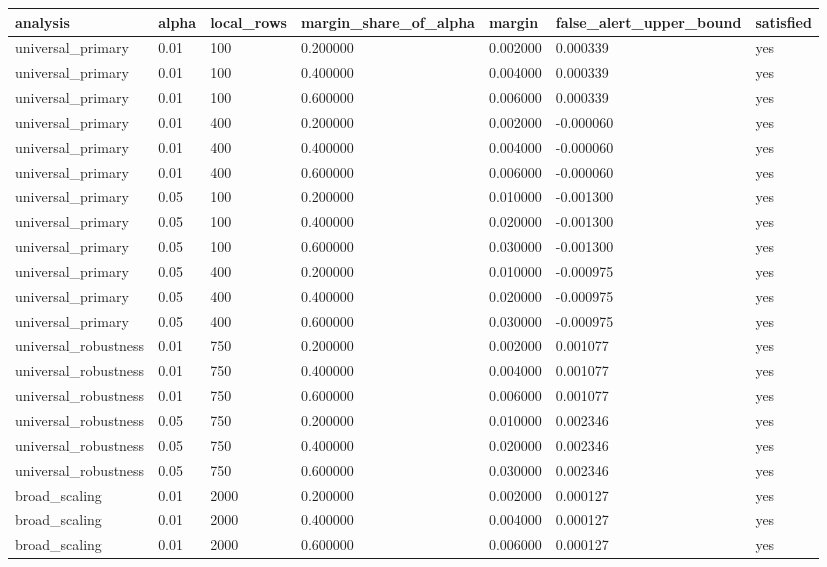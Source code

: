 \begin{tabular}{lllllll}
\toprule
analysis & alpha & local\_rows & margin\_share\_of\_alpha & margin & false\_alert\_upper\_bound & satisfied \\
\midrule
universal\_primary & 0.01 & 100 & 0.200000 & 0.002000 & 0.000339 & yes \\
universal\_primary & 0.01 & 100 & 0.400000 & 0.004000 & 0.000339 & yes \\
universal\_primary & 0.01 & 100 & 0.600000 & 0.006000 & 0.000339 & yes \\
universal\_primary & 0.01 & 400 & 0.200000 & 0.002000 & -0.000060 & yes \\
universal\_primary & 0.01 & 400 & 0.400000 & 0.004000 & -0.000060 & yes \\
universal\_primary & 0.01 & 400 & 0.600000 & 0.006000 & -0.000060 & yes \\
universal\_primary & 0.05 & 100 & 0.200000 & 0.010000 & -0.001300 & yes \\
universal\_primary & 0.05 & 100 & 0.400000 & 0.020000 & -0.001300 & yes \\
universal\_primary & 0.05 & 100 & 0.600000 & 0.030000 & -0.001300 & yes \\
universal\_primary & 0.05 & 400 & 0.200000 & 0.010000 & -0.000975 & yes \\
universal\_primary & 0.05 & 400 & 0.400000 & 0.020000 & -0.000975 & yes \\
universal\_primary & 0.05 & 400 & 0.600000 & 0.030000 & -0.000975 & yes \\
universal\_robustness & 0.01 & 750 & 0.200000 & 0.002000 & 0.001077 & yes \\
universal\_robustness & 0.01 & 750 & 0.400000 & 0.004000 & 0.001077 & yes \\
universal\_robustness & 0.01 & 750 & 0.600000 & 0.006000 & 0.001077 & yes \\
universal\_robustness & 0.05 & 750 & 0.200000 & 0.010000 & 0.002346 & yes \\
universal\_robustness & 0.05 & 750 & 0.400000 & 0.020000 & 0.002346 & yes \\
universal\_robustness & 0.05 & 750 & 0.600000 & 0.030000 & 0.002346 & yes \\
broad\_scaling & 0.01 & 2000 & 0.200000 & 0.002000 & 0.000127 & yes \\
broad\_scaling & 0.01 & 2000 & 0.400000 & 0.004000 & 0.000127 & yes \\
broad\_scaling & 0.01 & 2000 & 0.600000 & 0.006000 & 0.000127 & yes \\

\end{tabular}
